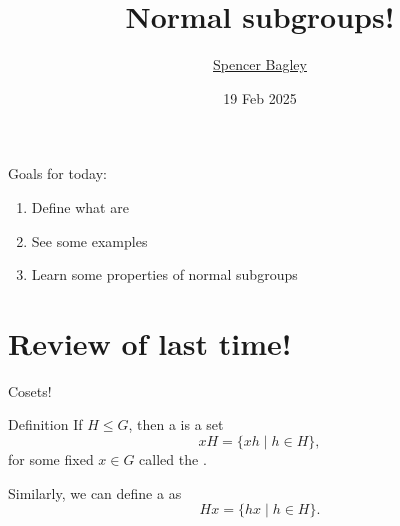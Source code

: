 \documentclass[8pt, handout]{beamer}
\title[Normal subgroups!]{Normal subgroups!}
\author[\href{mailto:sbagley@westminsteru.edu}{S. Bagley}]
       {\href{mailto:sbagley@westminsteru.edu}{Spencer Bagley}}
\institute[Westminster] { 
  \normalsize With many thanks to Matthew Macauley, \\
  \url{http://www.math.clemson.edu/~macaule/}}
\date[19 Feb 2025]{19 Feb 2025}
\newcommand{\Pause}{\pause}      %
\begin{document}
\frame{\titlepage}


\begin{frame}{Goals for today:}
  \begin{enumerate}
    \item Define what  are
    \item See some examples 
    \item Learn some properties of normal subgroups
  \end{enumerate}
\end{frame}


\section{Review of last time!}

\begin{frame}{Cosets!}
  
  \begin{block}{Definition}
    If $H\leq G$, then a  is a set
    \[
    xH=\big\{xh\mid h\in H\big\},
    \]
    for some fixed $x\in G$ called the . \Pause


    Similarly, we can define a  as
    \[
    Hx=\big\{hx\mid h\in H\big\}.
    \]
  \end{block}
  
\end{frame}

\end{document}
